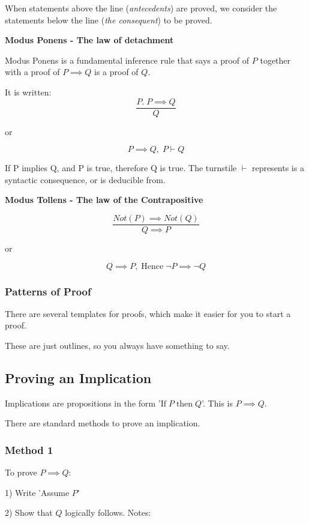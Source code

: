 When statements above the line (\emph{antecedents}) are proved, we consider the statements below the line (\emph{the consequent}) to be proved.

\textbf{Modus Ponens - The law of detachment}

Modus Ponens is a fundamental inference rule that says a proof of \(P\) together with a proof of \(P \implies Q\) is a proof of \(Q\).

It is written:
\[\frac{P.\; P \implies Q}{Q}\]

or 

\[P \implies Q, \; P \vdash Q\]

If P implies Q, and P is true, therefore Q is true. The turnstile \(\vdash\) represents is a syntactic consequence, or is deducible from.

\textbf{Modus Tollens - The law of the Contrapositive}

\[\frac{Not(P) \implies Not(Q)}{Q \implies P}\]

or 

\[Q \implies P, \; \text{Hence} \;\neg P \implies \neg Q\] 

\subsubsection{Patterns of Proof}

There are several templates for proofs, which make it easier for you to start a proof. 

These are just outlines, so you always have something to say.

\subsection{Proving an Implication}

Implications are propositions in the form '\(\text{If} \; P \; \text{then} \; Q\)'. This is \( P \implies Q\).

There are standard methods to prove an implication.

\subsubsection{Method 1}

To prove \(P \implies Q\):

1) Write 'Assume \(P\)'

2) Show that \(Q\) logically follows.
\vspace{1mm}
Notes:

